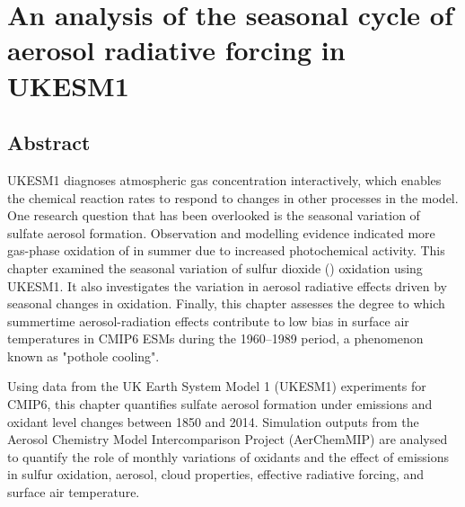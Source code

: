 
\chapter {An analysis of the seasonal cycle of aerosol radiative forcing in UKESM1}
\label{ch4:title}

\section*{Abstract}

UKESM1 diagnoses atmospheric gas concentration interactively, which enables the chemical reaction rates to respond to changes in other processes in the model. One research question that has been overlooked is the seasonal variation of sulfate aerosol formation. Observation and modelling evidence indicated more gas-phase oxidation of  in summer due to increased photochemical activity. This chapter examined the seasonal variation of sulfur dioxide () oxidation using UKESM1. It also investigates the variation in aerosol radiative effects driven by seasonal changes in oxidation. Finally, this chapter assesses the degree to which summertime aerosol-radiation effects contribute to low bias in surface air temperatures in CMIP6 ESMs during the 1960--1989 period, a phenomenon known as "pothole cooling".  

Using data from the UK Earth System Model 1 (UKESM1) experiments for CMIP6, this chapter quantifies sulfate aerosol formation under emissions and oxidant level changes between 1850 and 2014. Simulation outputs from the Aerosol Chemistry Model Intercomparison Project (AerChemMIP) are analysed to quantify the role of monthly variations of oxidants and the effect of emissions in sulfur oxidation, aerosol, cloud properties, effective radiative forcing, and surface air temperature. 

